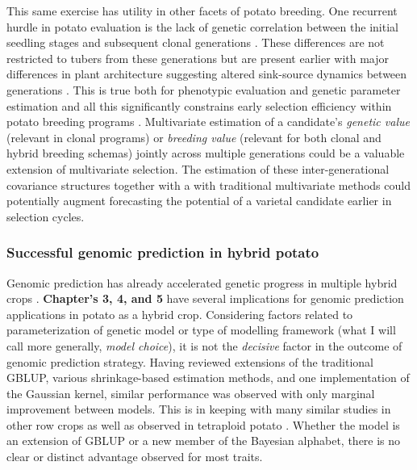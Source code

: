 \documentclass[
]{article}
\begin{document}
This same exercise has utility in other facets of potato breeding. One
recurrent hurdle in potato evaluation is the lack of genetic correlation
between the initial seedling stages and subsequent clonal generations
\autocite{Maris1988}. These differences are not restricted to tubers
from these generations but are present earlier with major differences in
plant architecture suggesting altered sink-source dynamics between
generations \autocite{Gu2025}. This is true both for phenotypic
evaluation and genetic parameter estimation and all this significantly
constrains early selection efficiency within potato breeding programs
\autocite{Davies1974,Gopal1998}. Multivariate estimation of a
candidate's \emph{genetic value} (relevant in clonal programs) or
\emph{breeding value} (relevant for both clonal and hybrid breeding
schemas) jointly across multiple generations could be a valuable
extension of multivariate selection. The estimation of these
inter-generational covariance structures together with a with
traditional multivariate methods could potentially augment forecasting
the potential of a varietal candidate earlier in selection cycles.

\subsubsection{Successful genomic prediction in hybrid
potato}\label{successful-genomic-prediction-in-hybrid-potato}

Genomic prediction has already accelerated genetic progress in multiple
hybrid crops \autocite{Labroo2021}. \textbf{Chapter's 3, 4, and 5} have
several implications for genomic prediction applications in potato as a
hybrid crop. Considering factors related to parameterization of genetic
model or type of modelling framework (what I will call more generally,
\emph{model choice}), it is not the \emph{decisive} factor in the
outcome of genomic prediction strategy. Having reviewed extensions of
the traditional GBLUP, various shrinkage-based estimation methods, and
one implementation of the Gaussian kernel, similar performance was
observed with only marginal improvement between models. This is in
keeping with many similar studies in other row crops as well as observed
in tetraploid potato
\autocite{Sverrisdottir2017,Endelman2018,Amadeu2019,Wilson2021a,Schrauf2021}.
Whether the model is an extension of GBLUP or a new member of the
Bayesian alphabet, there is no clear or distinct advantage observed for
most traits.
\end{document}
